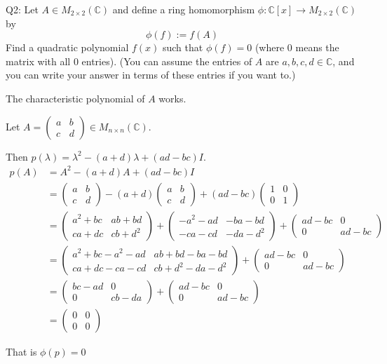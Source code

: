 \documentclass{article}
\newcommand\C{\mathbb{C}}
\begin{document}
Q2: Let $A \in M_{2×2} (\C)$ and define a ring homomorphism $\phi : \C[x] → M_{2×2} (\C)$ by
\[\phi(f ) := f (A)\]
Find a quadratic polynomial $f (x)$ such that $\phi(f ) = 0$ (where $0$ means the matrix with all $0$ entries).
(You can assume the entries of $A$ are $a, b, c, d \in \C$, and you can write your answer in terms of these
entries if you want to.)


The characteristic polynomial of $A$ works.

Let $A = \begin{pmatrix}a & b\\c&d\end{pmatrix} \in M_{n\times
  n}(\C).$

Then $p(\lambda) = \lambda^2 -(a+d)\lambda +(ad-bc)I$.
\begin{align*}
  p(A) &= A^2 -(a+d)A +(ad-bc)I \\
       &= \begin{pmatrix}a & b\\c&d\end{pmatrix}
    -(a+d)\begin{pmatrix}a & b\\c&d\end{pmatrix}
    +(ad-bc)\begin{pmatrix}1 &0\\0&1\end{pmatrix}\\
       &= \begin{pmatrix}a^2 +bc & ab+bd\\ca+dc&cb+d^2\end{pmatrix}
                                                 +\begin{pmatrix}-a^2-ad &
                                     -ba-bd\\-ca-cd&-da-d^2\end{pmatrix}
                                           +\begin{pmatrix}ad-bc &
                                             0\\0&ad-bc\end{pmatrix}\\
       &=\begin{pmatrix}a^2 +bc -a^2-ad & ab+bd -ba-bd\\ca+dc-ca-cd&cb+d^2-da-d^2\end{pmatrix}
                                                +\begin{pmatrix}ad-bc &
                                                  0\\0&ad-bc\end{pmatrix}\\
       &= \begin{pmatrix} bc-ad & 0 \\0 &  cb-da\end{pmatrix}
         +\begin{pmatrix} ad-bc & 0 \\ 0 & ad-bc\end{pmatrix}\\
  &= \begin{pmatrix} 0&0\\0&0\end{pmatrix}
\end{align*}

That is $\phi(p) = 0$
\end{document}
